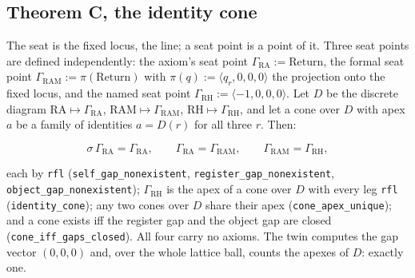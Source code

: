 \documentclass[10pt]{article}
\begin{document}
\hypertarget{theorem-c-the-identity-cone}{%
\subsection{Theorem C, the identity
cone}\label{theorem-c-the-identity-cone}}

The seat is the fixed locus, the line; a seat point is a point of it.
Three seat points are defined independently: the axiom's seat point
\(\Gamma_{\mathrm{RA}} := \mathrm{Return}\), the formal seat point
\(\Gamma_{\mathrm{RAM}} := \pi(\mathrm{Return})\) with
\(\pi(q) := \langle q_r, 0, 0, 0 \rangle\) the projection onto the fixed
locus, and the named seat point
\(\Gamma_{\mathrm{RH}} := \langle -1, 0, 0, 0 \rangle\). Let \(D\) be
the discrete diagram \(\mathrm{RA} \mapsto \Gamma_{\mathrm{RA}}\),
\(\mathrm{RAM} \mapsto \Gamma_{\mathrm{RAM}}\),
\(\mathrm{RH} \mapsto \Gamma_{\mathrm{RH}}\), and let a cone over \(D\)
with apex \(a\) be a family of identities \(a = D(r)\) for all three
\(r\). Then:

\[\sigma\,\Gamma_{\mathrm{RA}} = \Gamma_{\mathrm{RA}}, \qquad \Gamma_{\mathrm{RA}} = \Gamma_{\mathrm{RAM}}, \qquad \Gamma_{\mathrm{RAM}} = \Gamma_{\mathrm{RH}},\]

each by \texttt{rfl}
(\texttt{self\_\allowbreak gap\_\allowbreak nonexistent},
\texttt{register\_\allowbreak gap\_\allowbreak nonexistent},
\texttt{object\_\allowbreak gap\_\allowbreak nonexistent});
\(\Gamma_{\mathrm{RH}}\) is the apex of a cone over \(D\) with every leg
\texttt{rfl} (\texttt{identity\_\allowbreak cone}); any two cones over
\(D\) share their apex
(\texttt{cone\_\allowbreak apex\_\allowbreak unique}); and a cone exists
iff the register gap and the object gap are closed
(\texttt{cone\_\allowbreak iff\_\allowbreak gaps\_\allowbreak closed}).
All four carry no axioms. The twin computes the gap vector \((0, 0, 0)\)
and, over the whole lattice ball, counts the apexes of \(D\): exactly
one.
\end{document}
